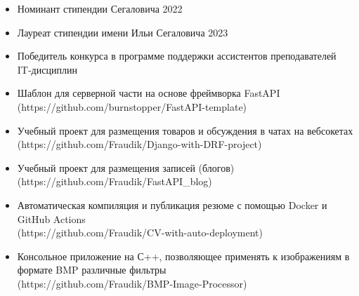 
\vspace{10pt}


\vspace{10pt}

\begin{itemize}
\item Номинант стипендии  Сегаловича 2022
\item Лауреат стипендии имени Ильи Сегаловича 2023
\item Победитель конкурса в программе поддержки ассистентов преподавателей IT‑дисциплин
\end{itemize}

\vspace{6.2pt}

\begin{itemize}
\item Шаблон для серверной части на основе фреймворка FastAPI \\
(https://github.com/burnstopper/FastAPI-template) \\
\item Учебный проект для размещения товаров и обсуждения в чатах на вебсокетах \\
(https://github.com/Fraudik/Django-with-DRF-project) \\
\item Учебный проект для размещения записей (блогов) \\
(https://github.com/Fraudik/FastAPI\_blog) \\
\item Автоматическая компиляция и публикация резюме с помощью Docker и GitHub Actions \\
(https://github.com/Fraudik/CV-with-auto-deployment) \\
\item  Консольное приложение на С++, позволяющее применять к изображениям в формате BMP различные фильтры \\
(https://github.com/Fraudik/BMP-Image-Processor) \\
\end{itemize}
